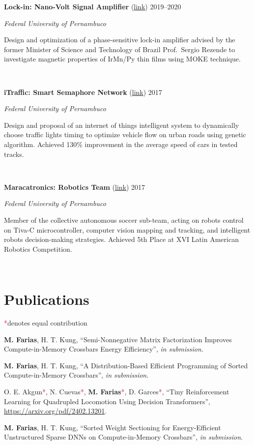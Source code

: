 \documentclass[letterpaper,10pt]{article}
\newcommand{\entry}[4]{

\begin{minipage}[t]{.15\textwidth}
\end{minipage}
\hfill\vline\hfill 
\begin{minipage}[t]{0.95\textwidth}
#2 \hfill \textsc{#1}

\textit{#3}

\footnotesize{#4}
\end{minipage}\\\vspace{.25cm}}
\newcommand{\ufpe}{Federal University of Pernambuco}
\newcommand{\co}{\textcolor{crimson}{*}}
\begin{document}
\entry{2019--2020}{\textbf{Lock-in: Nano-Volt Signal Amplifier} (\href{https://www.matheussfarias.com/lockin.html}{link})}{\ufpe}{
	Design and optimization of a phase-sensitive lock-in amplifier advised by the former Minister of Science and Technology of Brazil Prof.\ Sergio Rezende to investigate magnetic properties of IrMn/Py thin films using MOKE technique.
}

\entry{2017}{\textbf{iTraffic: Smart Semaphore Network} (\href{https://www.matheussfarias.com/itraffic.html}{link})}{\ufpe}{
	Design and proposal of an internet of things intelligent system to dynamically choose traffic lights timing to optimize vehicle flow on urban roads using genetic algorithm. Achieved 130\% improvement in the average speed of cars in tested tracks.
}

\entry{2017}{\textbf{Maracatronics: Robotics Team} (\href{https://www.matheussfarias.com/maracatronics.html}{link})}{\ufpe}{
	Member of the collective autonomous soccer sub-team, acting on robots control on Tiva-C microcontroller, computer vision mapping and tracking, and intelligent robots decision-making strategies. Achieved 5th Place at XVI Latin American Robotics Competition.
}

\vspace*{-.25cm}

\section{Publications}
\co denotes equal contribution
\vspace*{.1cm}
\begin{etaremune}
	\renewcommand{\labelenumi}{[\theenumi]}
    \item \textbf{M. Farias}, H. T. Kung, ``Semi-Nonnegative Matrix Factorization Improves Compute-in-Memory Crossbars Energy Efficiency'', \textit{in submission}.
	\item \textbf{M. Farias}, H. T. Kung, ``A Distribution-Based Efficient Programming of Sorted Compute-in-Memory Crossbars'', \textit{in submission}.
    \item O. E. Akgun\co, N. Cuevas\co, \textbf{M. Farias}\co, D. Garces\co, ``Tiny Reinforcement Learning for Quadrupled Locomotion Using Decision Transformers'', \href{https://arxiv.org/pdf/2402.13201}{https://arxiv.org/pdf/2402.13201}.
	\item \textbf{M. Farias}, H. T. Kung, ``Sorted Weight Sectioning for Energy-Efficient Unstructured Sparse DNNs on Compute-in-Memory Crossbars'', \textit{in submission}.
\end{etaremune}
\vspace*{-.25cm}
\end{document}
